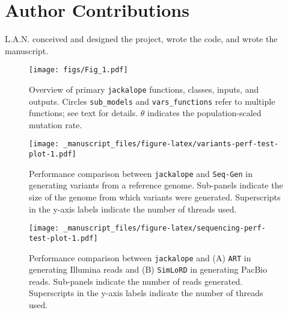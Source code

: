 \documentclass[12pt,]{article}
\begin{document}
\hypertarget{author-contributions}{%
\section{Author Contributions}\label{author-contributions}}

L.A.N. conceived and designed the project, wrote the code, and wrote the manuscript.

\begin{figure}
\centering
\texttt{[image: figs/Fig\_1.pdf]}
\caption{\label{fig:jackalope-overview-figure}Overview of primary \texttt{jackalope} functions, classes, inputs, and outputs. Circles \texttt{sub\_models} and \texttt{vars\_functions} refer to multiple functions; see text for details. \(\theta\) indicates the population-scaled mutation rate.}
\end{figure}

\begin{figure}
\centering
\texttt{[image: \_manuscript\_files/figure-latex/variants-perf-test-plot-1.pdf]}
\caption{\label{fig:variants-perf-test-plot}Performance comparison between \texttt{jackalope} and \texttt{Seq-Gen} in generating variants from a reference genome. Sub-panels indicate the size of the genome from which variants were generated. Superscripts in the y-axis labels indicate the number of threads used.}
\end{figure}

\begin{figure}
\centering
\texttt{[image: \_manuscript\_files/figure-latex/sequencing-perf-test-plot-1.pdf]}
\caption{\label{fig:sequencing-perf-test-plot}Performance comparison between \texttt{jackalope} and (A) \texttt{ART} in generating Illumina reads and (B) \texttt{SimLoRD} in generating PacBio reads. Sub-panels indicate the number of reads generated. Superscripts in the y-axis labels indicate the number of threads used.}
\end{figure}
\end{document}
